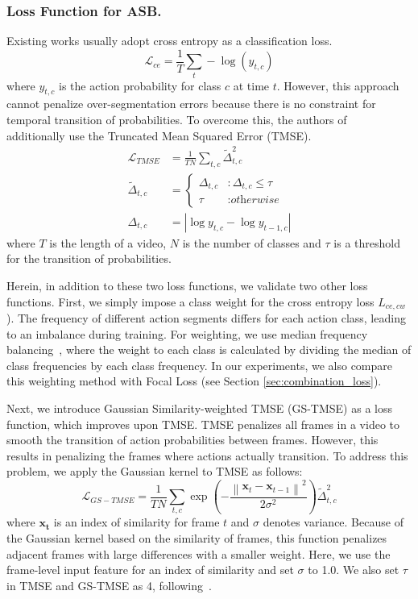 \documentclass[10pt,twocolumn,letterpaper]{article}
\begin{document}
\subsubsection{Loss Function for ASB.}
\label{sec:loss_asb}
Existing works usually adopt cross entropy as a classification loss.
\begin{equation}
\mathcal{L}_{ce}=\frac{1}{T} \sum_{t}-\log \left(y_{t, c}\right)
\end{equation} \noindent
where $y_{t,c}$ is the action probability for class $c$ at time $t$.
However, this approach cannot penalize over-segmentation errors because there is no constraint for temporal transition of probabilities. To overcome this, the authors of~\cite{mstcn} additionally use the Truncated Mean Squared Error (TMSE).
\begin{align}
\mathcal{L}_{TMSE}&=\frac{1}{T N} \sum_{t, c} \tilde{\Delta}_{t, c}^{2} \\
\tilde{\Delta}_{t, c}&=\left\{\begin{array}{ll}{\Delta_{t, c}} & {: \Delta_{t, c} \leq \tau} \\ {\tau} & {: \textit {otherwise}}\end{array}\right.\\
\Delta_{t, c}&=\left|\log y_{t, c}-\log y_{t-1, c}\right|
\end{align}
\noindent
where $T$ is the length of a video, $N$ is the number of classes and $\tau$ is a threshold for the transition of probabilities.

Herein, in addition to these two loss functions, we validate two other loss functions.
First, we simply impose a class weight for the cross entropy loss $L_{ce, cw}$).
The frequency of different action segments differs for each action class, leading to an imbalance during training.
For weighting, we use median frequency balancing~\cite{median},
where the weight to each class is calculated by dividing the median of class frequencies by each class frequency.
In our experiments, we also compare this weighting method with Focal Loss \cite{focal} (see Section \ref{sec:combination_loss}).

Next, we introduce Gaussian Similarity-weighted TMSE (GS-TMSE) as a loss function, which improves upon TMSE.
TMSE penalizes all frames in a video to smooth the transition of action probabilities between frames.
However, this results in penalizing the frames where actions actually transition.
To address this problem, we apply the Gaussian kernel to TMSE as follows:
\begin{equation}
\mathcal{L}_{GS-TMSE}=\frac{1}{T N} \sum_{t, c} \exp \left(-\frac{\left\|\mathbf{x}_{t}-\mathbf{x}_{t-1}\right\|^{2}}{2 \sigma^{2}}\right) \tilde{\Delta}_{t, c}^{2}
\end{equation}
\noindent
where $\mathbf{x_t}$ is an index of similarity for frame $t$ and $\sigma$ denotes variance.
Because of the Gaussian kernel based on the similarity of frames, this function penalizes adjacent frames with large differences with a smaller weight.
Here, we use the frame-level input feature for an index of similarity and set $\sigma$ to 1.0.
We also set $\tau$ in TMSE and GS-TMSE as 4, following~\cite{mstcn}.
\end{document}

